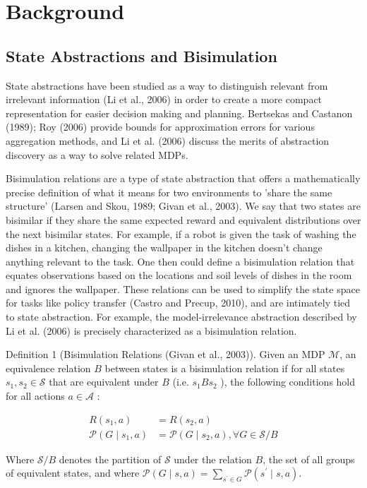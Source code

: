 \documentclass[10pt]{article}
\begin{document}
\section{Background}
\subsection{State Abstractions and Bisimulation}
State abstractions have been studied as a way to distinguish relevant from irrelevant information (Li et al., 2006) in order to create a more compact representation for easier decision making and planning. Bertsekas and Castanon (1989); Roy (2006) provide bounds for approximation errors for various aggregation methods, and Li et al. (2006) discuss the merits of abstraction discovery as a way to solve related MDPs.

Bisimulation relations are a type of state abstraction that offers a mathematically precise definition of what it means for two environments to 'share the same structure' (Larsen and Skou, 1989; Givan et al., 2003). We say that two states are bisimilar if they share the same expected reward and equivalent distributions over the next bisimilar states. For example, if a robot is given the task of washing the dishes in a kitchen, changing the wallpaper in the kitchen doesn't change anything relevant to the task. One then could define a bisimulation relation that equates observations based on the locations and soil levels of dishes in the room and ignores the wallpaper. These relations can be used to simplify the state space for tasks like policy transfer (Castro and Precup, 2010), and are intimately tied to state abstraction. For example, the model-irrelevance abstraction described by Li et al. (2006) is precisely characterized as a bisimulation relation.

Definition 1 (Bisimulation Relations (Givan et al., 2003)). Given an MDP $\mathcal{M}$, an equivalence relation $B$ between states is a bisimulation relation if for all states $s_{1}, s_{2} \in \mathcal{S}$ that are equivalent under $B$ (i.e. $s_{1} B s_{2}$ ), the following conditions hold for all actions $a \in \mathcal{A}$ :

\[
\begin{aligned}
R\left(s_{1}, a\right) & =R\left(s_{2}, a\right) \\
\mathcal{P}\left(G \mid s_{1}, a\right) & =\mathcal{P}\left(G \mid s_{2}, a\right), \forall G \in \mathcal{S} / B
\end{aligned}
\]

Where $\mathcal{S} / B$ denotes the partition of $\mathcal{S}$ under the relation $B$, the set of all groups of equivalent states, and where $\mathcal{P}(G \mid s, a)=\sum_{s^{\prime} \in G} \mathcal{P}\left(s^{\prime} \mid s, a\right)$.
\end{document}
